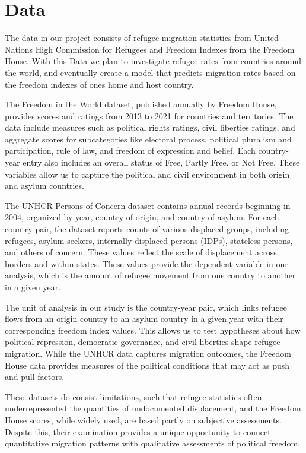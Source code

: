 \documentclass{article}
\theoremstyle{plain}
\theoremstyle{definition}
\theoremstyle{remark}
\begin{document}
\section{Data}
\label{Data}
The data in our project consists of refugee migration statistics from United Nations High Commission for Refugees and Freedom Indexes from the Freedom House. With this Data we plan to investigate refugee rates from countries around the world, and eventually create a model that predicts migration rates based on the freedom indexes of ones home and host country.

The Freedom in the World dataset, published annually by Freedom House, provides scores and ratings from 2013 to 2021 for countries and territories. The data include measures such as political rights ratings, civil liberties ratings, and aggregate scores for subcategories like electoral process, political pluralism and participation, rule of law, and freedom of expression and belief. Each country-year entry also includes an overall status of Free, Partly Free, or Not Free. These variables allow us to capture the political and civil environment in both origin and asylum countries.

The UNHCR Persons of Concern dataset contains annual records beginning in 2004, organized by year, country of origin, and country of asylum. For each country pair, the dataset reports counts of various displaced groups, including refugees, asylum-seekers, internally displaced persons (IDPs), stateless persons, and others of concern. These values reflect the scale of displacement across borders and within states. These values provide the dependent variable in our analysis, which is the amount of refugee movement from one country to another in a given year.

The unit of analysis in our study is the country-year pair, which links refugee flows from an origin country to an asylum country in a given year with their corresponding freedom index values. This allows us to test hypotheses about how political repression, democratic governance, and civil liberties shape refugee migration. While the UNHCR data captures migration outcomes, the Freedom House data provides measures of the political conditions that may act as push and pull factors.

These datasets do consist limitations, such that refugee statistics often underrepresented the quantities of undocumented displacement, and the Freedom House scores, while widely used, are based partly on subjective assessments. Despite this, their examination provides a unique opportunity to connect quantitative migration patterns with qualitative assessments of political freedom.
\end{document}
